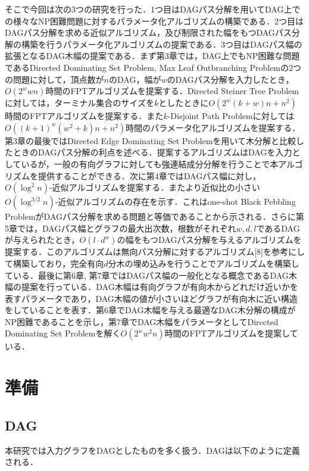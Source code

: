 \documentclass[master]{kuisthesis}		%
\theoremstyle{plain}
\theoremstyle{definition}
\begin{document}
そこで今回は次の3つの研究を行った．1つ目はDAGパス分解を用いてDAG上での様々なNP困難問題に対するパラメータ化アルゴリズムの構築である．2つ目はDAGパス分解を求める近似アルゴリズム，及び制限された幅をもつDAGパス分解の構築を行うパラメータ化アルゴリズムの提案である．3つ目はDAGパス幅の拡張となるDAG木幅の提案である．まず第3章では，DAG上でもNP困難な問題であるDirected Dominating Set Problem, Max Leaf Outbranching Problemの2つの問題に対して，頂点数が$n$のDAG，幅が$w$のDAGパス分解を入力したとき，$O(2^wwn)$時間のFPTアルゴリズムを提案する．Directed Steiner Tree Problemに対しては，ターミナル集合のサイズを$k$としたときに$O(2^w(k+w)n+n^2)$時間のFPTアルゴリズムを提案する．また$k$-Disjoint Path Problemに対しては$O((k+1)^w(w^2+k)n+n^2)$時間のパラメータ化アルゴリズムを提案する．第3章の最後ではDirected Edge Dominating Set Problemを用いて木分解と比較したときのDAGパス分解の利点を述べる．提案するアルゴリズムはDAGを入力としているが，一般の有向グラフに対しても強連結成分分解を行うことで本アルゴリズムを提供することができる．次に第4章ではDAGパス幅に対し，$O(\log^2 n)$-近似アルゴリズムを提案する．またより近似比の小さい$O(\log^{3/2} n)$-近似アルゴリズムの存在を示す．これはone-shot Black Pebbling ProblemがDAGパス分解を求める問題と等価であることから示される．さらに第5章では，DAGパス幅とグラフの最大出次数，根数がそれぞれ$w, d, l$であるDAGが与えられたとき，$O(l\cdot d^w)$の幅をもつDAGパス分解を与えるアルゴリズムを提案する．このアルゴリズムは無向パス分解に対するアルゴリズム[8]を参考にして構築しており，完全有向$d$分木の埋め込みを行うことでアルゴリズムを構築している．最後に第6章, 第7章ではDAGパス幅の一般化となる概念であるDAG木幅の提案を行っている．DAG木幅は有向グラフが有向木からどれだけ近いかを表すパラメータであり，DAG木幅の値が小さいほどグラフが有向木に近い構造をしていることを表す．第6章でDAG木幅を与える最適なDAG木分解の構成がNP困難であることを示し，第7章でDAG木幅をパラメータとしてDirected Dominating Set Problemを解く$O(2^ww^2n)$時間のFPTアルゴリズムを提案している．










\section{準備} %


\subsection{DAG} %
本研究では入力グラフをDAGとしたものを多く扱う．DAGは以下のように定義される．
\end{document}
